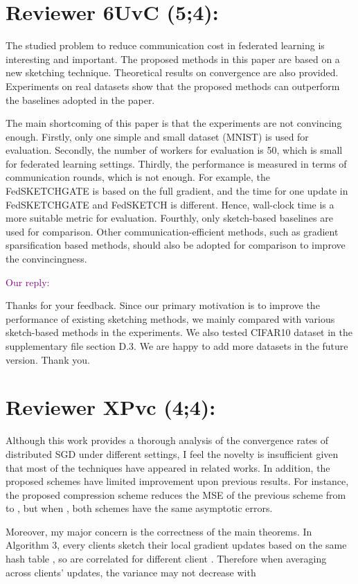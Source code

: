 \documentclass{article}
\begin{document}
\section{Reviewer 6UvC (5;4):}

The studied problem to reduce communication cost in federated learning is interesting and important. The proposed methods in this paper are based on a new sketching technique. Theoretical results on convergence are also provided. Experiments on real datasets show that the proposed methods can outperform the baselines adopted in the paper.

The main shortcoming of this paper is that the experiments are not convincing enough. Firstly, only one simple and small dataset (MNIST) is used for evaluation. Secondly, the number of workers for evaluation is 50, which is small for federated learning settings. Thirdly, the performance is measured in terms of communication rounds, which is not enough. For example, the FedSKETCHGATE is based on the full gradient, and the time for one update in FedSKETCHGATE and FedSKETCH is different. Hence, wall-clock time is a more suitable metric for evaluation. Fourthly, only sketch-based baselines are used for comparison. Other communication-efficient methods, such as gradient sparsification based methods, should also be adopted for comparison to improve the convincingness.


\textcolor{purple}{Our reply:}

Thanks for your feedback. Since our primary motivation is to improve the performance of existing sketching methods, we mainly compared with various sketch-based methods in the experiments. We also tested CIFAR10 dataset in the supplementary file section D.3. We are happy to add more datasets in the future version. Thank you.


\section{Reviewer XPvc (4;4):}
Although this work provides a thorough analysis of the convergence rates of distributed SGD under different settings, I feel the novelty is insufficient given that most of the techniques have appeared in related works. In addition, the proposed schemes have limited improvement upon previous results. For instance, the proposed compression scheme  reduces the MSE of the previous scheme  from  to , but when , both schemes have the same asymptotic errors.

Moreover, my major concern is the correctness of the main theorems. In Algorithm 3, every clients sketch their local gradient updates 
 based on the same hash table , so 
 are correlated for different client . Therefore when averaging across  clients' updates, the variance may not decrease with 
 
\end{document}
